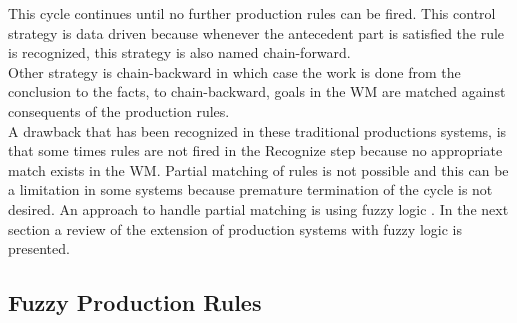 This cycle continues until no further production rules can be fired.
This control strategy is data driven because whenever the antecedent
part is satisfied the rule is recognized, this strategy is also named
chain-forward. \\Other strategy is chain-backward in which case the work
is done from the conclusion to the facts, to chain-backward, goals in
the WM are matched against consequents of the production
rules.\\A drawback that has been recognized in these traditional
productions systems, is that some times rules are not fired in the
Recognize step because no appropriate match exists in the WM. Partial
matching of rules is not possible and this can be a limitation in some
systems because premature termination of the cycle is not desired. An
approach to handle partial matching is using fuzzy logic
 \cite{konar2006computational}. In the next section a review of the
extension of production systems with fuzzy logic is presented.

\subsection{Fuzzy Production Rules}

